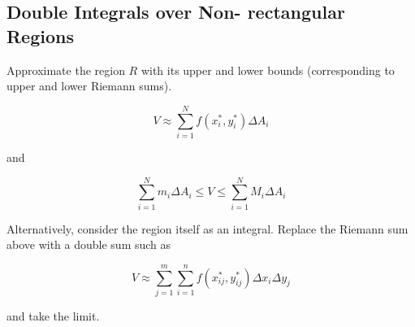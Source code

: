 \documentclass[12pt]{article}
\begin{document}
\subsection{Double Integrals over Non- rectangular Regions}

Approximate the region $R$ with its upper and lower bounds (corresponding to upper and lower Riemann sums). 

$$V \approx \sum_{i=1}^N f(x_i^*, y_i^*) \Delta A_i$$

and

$$ \sum_{i=1}^N m_i \Delta A_i \leq V \leq \sum_{i=1}^N M_i \Delta A_i$$

Alternatively, consider the region itself as an integral. Replace the Riemann sum above with a double sum such as

$$V \approx \sum_{j=1}^m \sum_{i=1}^n f(x_{ij}^*, y_{ij}^*) \Delta x_i \Delta y_j$$

and take the limit.
\end{document}
